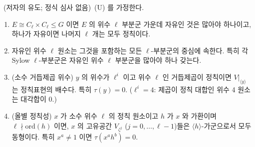 \begin{lemma}[구조 보조정리]\label{lem:sylow}\tagP\ (저자의 유도; 정식 심사 없음)\
(U) 를 가정한다.
\begin{enumerate}
\item $E\cong C_\ell\times C_\ell\le G$ 이면 $E$ 의 위수 $\ell$ 부분군 가운데 자유인 것은 많아야 하나이고, 하나가 자유이면 나머지 $\ell$ 개는 모두 정칙이다.
\item 자유인 위수 $\ell$ 원소는 그것을 포함하는 모든 $\ell$-부분군의 중심에 속한다. 특히 각 Sylow $\ell$-부분군은 자유인 위수 $\ell$ 부분군을 많아야 하나 갖는다.
\item (소수 거듭제곱 위수) $y$ 의 위수가 $\ell^i$ 이고 위수 $\ell$ 인 거듭제곱이 정칙이면 $V|_{\langle y\rangle}$ 는 정칙표현의 배수다. 특히 $\tau(y)=0$. ($\ell^i=4$: 제곱이 정칙 대합인 위수 4 원소는 대각합이 0.)
\item (올별 정칙성) $x$ 가 소수 위수 $\ell$ 의 정칙 원소이고 $h$ 가 $x$ 와 가환이며 $\ell\nmid\mathrm{ord}(h)$ 이면, $x$ 의 고유공간 $V_{\zeta^j}$ ($j=0,\dots,\ell-1$)들은 $\langle h\rangle$-가군으로서 모두 동형이다. 특히 $x^a\ne1$ 이면 $\tau(x^ah^b)=0$.
\end{enumerate}
\end{lemma}
